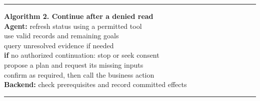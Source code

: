\begin{table}[t]
\small
\centering
\begin{minipage}{.98\columnwidth}
\hrule\vspace{4pt}
\textbf{Algorithm 2. Continue after a denied read}\\[2pt]
\textbf{Agent:} refresh status using a permitted tool\\
\hspace*{.75em} use valid records and remaining goals\\
\hspace*{.75em} query unresolved evidence if needed\\
\hspace*{.75em} \textbf{if} no authorized continuation: stop or seek consent\\
\hspace*{.75em} propose a plan and request its missing inputs\\
\hspace*{.75em} confirm as required, then call the business action\\
\textbf{Backend:} check prerequisites and record committed effects
\vspace{4pt}\hrule
\end{minipage}
\end{table}

